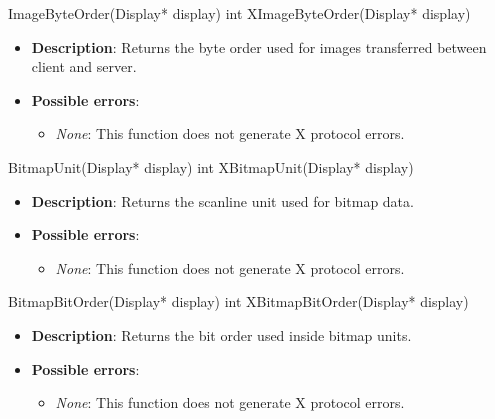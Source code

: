 \documentclass{report}
\begin{document}
\begin{itemize}
        \begin{cppcode}
            ImageByteOrder(Display* display)
            int XImageByteOrder(Display* display)
        \end{cppcode}
        \begin{itemize}
            \item \textbf{Description}: Returns the byte order used for images transferred between client and server.
            \item \textbf{Possible errors}:
                \begin{itemize}
                    \item \textit{None}: This function does not generate X protocol errors.
                \end{itemize}
        \end{itemize}

        \begin{cppcode}
            BitmapUnit(Display* display)
            int XBitmapUnit(Display* display)
        \end{cppcode}
        \begin{itemize}
            \item \textbf{Description}: Returns the scanline unit used for bitmap data.
            \item \textbf{Possible errors}:
                \begin{itemize}
                    \item \textit{None}: This function does not generate X protocol errors.
                \end{itemize}
        \end{itemize}

        \begin{cppcode}
            BitmapBitOrder(Display* display)
            int XBitmapBitOrder(Display* display)
        \end{cppcode}
        \begin{itemize}
            \item \textbf{Description}: Returns the bit order used inside bitmap units.
            \item \textbf{Possible errors}:
                \begin{itemize}
                    \item \textit{None}: This function does not generate X protocol errors.
                \end{itemize}
        \end{itemize}


\end{itemize}
\end{document}
